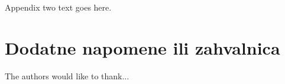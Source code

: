 \documentclass[conference]{IEEEtran}
\begin{document}
\section{}
Appendix two text goes here.



\section*{Dodatne napomene ili zahvalnica}


The authors would like to thank...





%
%


\end{document}

